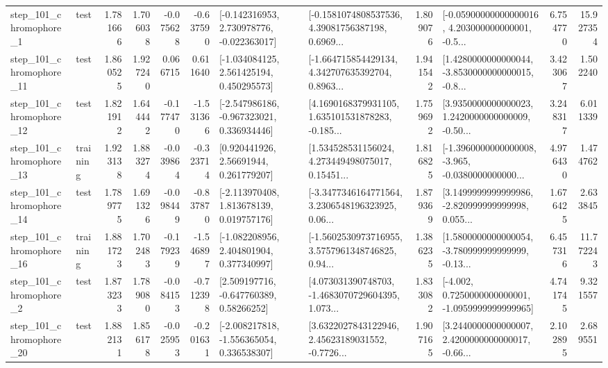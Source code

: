 \begin{tabular}{llrrrrllrlrr}
   step\_101\_chromophore\_1 &      test &      1.781666 &    1.706038 &     -0.075628 & -0.637590 &   [-0.142316953, 2.730978776, -0.022363017] &  [-0.1581074808537536, 4.39081756387198, 0.6969... &       1.809076 &  [-0.05900000000000016, 4.203000000000001, -0.5... &            6.754770 &         15.927354 \\
  step\_101\_chromophore\_11 &      test &      1.860525 &    1.927240 &      0.066715 &  0.611640 &    [-1.034084125, 2.561425194, 0.450295573] &  [-1.664715854429134, 4.342707635392704, 0.8963... &       1.941542 &  [1.4280000000000044, -3.8530000000000015, -0.8... &            3.423067 &          1.502240 \\
  step\_101\_chromophore\_12 &      test &      1.821912 &    1.644442 &     -0.177470 & -1.531366 &   [-2.547986186, -0.967323021, 0.336934446] &  [4.1690168379931105, 1.635101531878283, -0.185... &       1.759692 &  [3.9350000000000023, 1.2420000000000009, -0.50... &            3.248317 &          6.011339 \\
  step\_101\_chromophore\_13 &  training &      1.923138 &    1.883274 &     -0.039864 & -0.323714 &      [0.920441926, 2.56691944, 0.261779207] &  [1.534528531156024, 4.273449498075017, 0.15451... &       1.816825 &  [-1.3960000000000008, -3.965, -0.0380000000000... &            4.976430 &          1.474762 \\
  step\_101\_chromophore\_14 &      test &      1.789775 &    1.691326 &     -0.098449 & -0.837870 &    [-2.113970408, 1.813678139, 0.019757176] &  [-3.3477346164771564, 3.2306548196323925, 0.06... &       1.879369 &  [3.1499999999999986, -2.820999999999998, 0.055... &            1.676425 &          2.633845 \\
  step\_101\_chromophore\_16 &  training &      1.881723 &    1.702483 &     -0.179239 & -1.546897 &    [-1.082208956, 2.404801904, 0.377340997] &  [-1.5602530973716955, 3.5757961348746825, 0.94... &       1.386235 &  [1.5800000000000054, -3.780999999999999, -0.13... &            6.457316 &         11.772243 \\
   step\_101\_chromophore\_2 &      test &      1.873233 &    1.789080 &     -0.084153 & -0.712398 &     [2.509197716, -0.647760389, 0.58266252] &  [4.073031390748703, -1.4683070729604395, 1.073... &       1.833082 &  [-4.002, 0.7250000000000001, -1.0959999999999965] &            4.741745 &          9.321557 \\
  step\_101\_chromophore\_20 &      test &      1.882131 &    1.856178 &     -0.025953 & -0.201631 &   [-2.008217818, -1.556365054, 0.336538307] &  [3.6322027843122946, 2.45623189031552, -0.7726... &       1.907165 &  [3.2440000000000007, 2.4200000000000017, -0.66... &            2.102895 &          2.689551 \\

\end{tabular}
